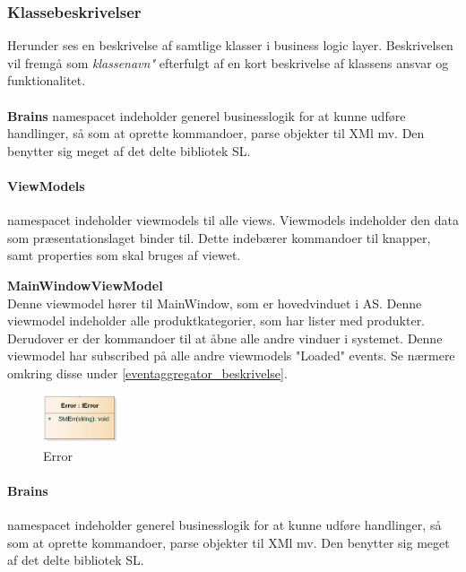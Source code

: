 \subsubsection{Klassebeskrivelser}

Herunder ses en  beskrivelse af samtlige klasser i business logic layer. Beskrivelsen vil fremgå som \textit{klassenavn"} efterfulgt af en kort beskrivelse af klassens ansvar og funktionalitet.\\\\


\textbf{Brains} namespacet indeholder generel businesslogik for at kunne udføre handlinger, så som at oprette kommandoer, parse objekter til XMl mv. Den benytter sig meget af det delte bibliotek \gls{SL}.\\

\paragraph{ViewModels} namespacet indeholder viewmodels til alle views. Viewmodels indeholder den data som præsentationslaget binder til. Dette indebærer kommandoer til knapper, samt properties som skal bruges af viewet.

\textbf{MainWindowViewModel}\\
Denne viewmodel hører til MainWindow, som er hovedvinduet i \gls{AS}. Denne viewmodel indeholder alle produktkategorier, som har lister med produkter. Derudover er der kommandoer til at åbne alle andre vinduer i systemet. Denne viewmodel har subscribed på alle andre viewmodels "Loaded" events. Se nærmere omkring disse under \ref{eventaggregator_beskrivelse}.
\begin{figure}[H]
	\centering
	\includegraphics[width=0.2\textwidth]{Systemdesign/backend/klassebeskrivelser/Images/Error.png}
	\caption{Error}
	\label{fig:modelhandler}
\end{figure}

\paragraph{Brains} namespacet indeholder generel businesslogik for at kunne udføre handlinger, så som at oprette kommandoer, parse objekter til XMl mv. Den benytter sig meget af det delte bibliotek \gls{SL}.\\

